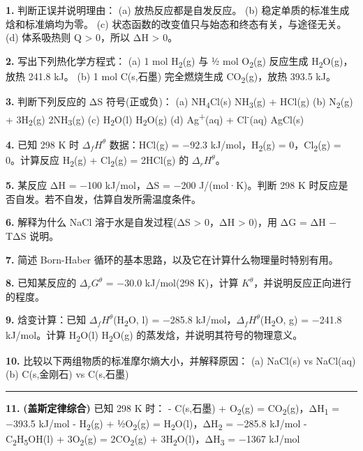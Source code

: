 \textbf{1.} 判断正误并说明理由：
(a) 放热反应都是自发反应。
(b) 稳定单质的标准生成焓和标准熵均为零。
(c) 状态函数的改变值只与始态和终态有关，与途径无关。
(d) 体系吸热则 Q \textgreater{} 0，所以 ΔH \textgreater{} 0。

\textbf{2.} 写出下列热化学方程式：
(a) 1 mol H\textsubscript{2}(g) 与 ½ mol O\textsubscript{2}(g) 反应生成 H\textsubscript{2}O(g)，放热 241.8 kJ。
(b) 1 mol C(s,石墨) 完全燃烧生成 CO\textsubscript{2}(g)，放热 393.5 kJ。

\textbf{3.} 判断下列反应的 ΔS 符号(正或负)：
(a) NH\textsubscript{4}Cl(s) \箭 NH\textsubscript{3}(g) + HCl(g)
(b) N\textsubscript{2}(g) + 3H\textsubscript{2}(g) \箭 2NH\textsubscript{3}(g)
(c) H\textsubscript{2}O(l) \箭 H\textsubscript{2}O(g)
(d) Ag\textsuperscript{+}(aq) + Cl\textsuperscript{-}(aq) \箭 AgCl(s)

\textbf{4.} 已知 298 K 时 \(\Delta_f H^\theta\) 数据：HCl(g) = −92.3 kJ/mol，H\textsubscript{2}(g) = 0，Cl\textsubscript{2}(g) = 0。计算反应 H\textsubscript{2}(g) + Cl\textsubscript{2}(g) = 2HCl(g) 的 \(\Delta_r H^\theta\)。

\textbf{5.} 某反应 ΔH = −100 kJ/mol，ΔS = −200 J/(mol·K)。判断 298 K 时反应是否自发。若不自发，估算自发所需温度条件。

\textbf{6.} 解释为什么 NaCl 溶于水是自发过程(ΔS \textgreater{} 0，ΔH \textgreater{} 0)，用 ΔG = ΔH − TΔS 说明。

\textbf{7.} 简述 Born-Haber 循环的基本思路，以及它在计算什么物理量时特别有用。

\textbf{8.} 已知某反应的 \(\Delta_r G^\theta\) = −30.0 kJ/mol(298 K)，计算 \(K^\theta\)，并说明反应正向进行的程度。

\textbf{9.} 焓变计算：已知 \(\Delta_f H^\theta\)(H\textsubscript{2}O, l) = −285.8 kJ/mol，\(\Delta_f H^\theta\)(H\textsubscript{2}O, g) = −241.8 kJ/mol。计算 H\textsubscript{2}O(l) \箭 H\textsubscript{2}O(g) 的蒸发焓，并说明其符号的物理意义。

\textbf{10.} 比较以下两组物质的标准摩尔熵大小，并解释原因：
(a) NaCl(s) vs NaCl(aq)
(b) C(s,金刚石) vs C(s,石墨)

\begin{center}\rule{0.5\linewidth}{0.5pt}\end{center}

\textbf{11.} \textbf{(盖斯定律综合)} 已知 298 K 时：
- C(s,石墨) + O\textsubscript{2}(g) = CO\textsubscript{2}(g)，ΔH\textsubscript{1} = −393.5 kJ/mol
- H\textsubscript{2}(g) + ½O\textsubscript{2}(g) = H\textsubscript{2}O(l)，ΔH\textsubscript{2} = −285.8 kJ/mol
- C\textsubscript{2}H\textsubscript{5}OH(l) + 3O\textsubscript{2}(g) = 2CO\textsubscript{2}(g) + 3H\textsubscript{2}O(l)，ΔH\textsubscript{3} = −1367 kJ/mol

